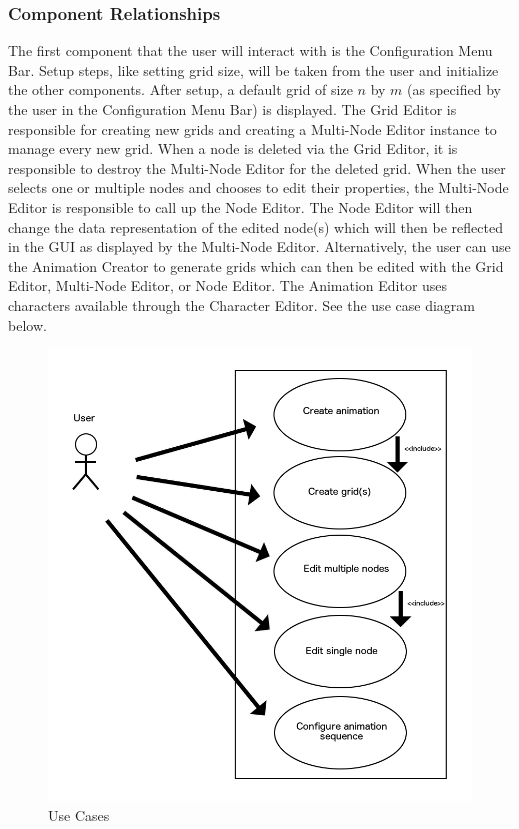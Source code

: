\documentclass[12pt]{article}
\begin{document}
	\subsubsection{Component Relationships}
  	The first component that the user will interact with is the Configuration Menu Bar. Setup steps, like setting grid size, will be taken from the user and initialize the other components.	
  	After setup, a default grid of size $n$ by $m$ (as specified by the user in the Configuration Menu Bar) is displayed. The Grid Editor is responsible for creating new grids and creating a Multi-Node Editor instance to manage every new grid. When a node is deleted via the Grid Editor, it is responsible to destroy the Multi-Node Editor for the deleted grid.  	
  	When the user selects one or multiple nodes and chooses to edit their properties, the Multi-Node Editor is responsible to call up the Node Editor. The Node Editor will then change the data representation of the edited node(s) which will then be reflected in the GUI as displayed by the Multi-Node Editor.  	
  	Alternatively, the user can use the Animation Creator to generate grids which can then be edited with the Grid Editor, Multi-Node Editor, or Node Editor. The Animation Editor uses characters available through the Character Editor.  	
  	See the use case diagram below.	
    
  	\begin{figure}[ht!]
  		\centering
  		\includegraphics[width=0.9\linewidth]{Relationship_Use.png}
  		\caption{Use Cases}
  	\end{figure}
	\clearpage	
\newpage
\end{document}
